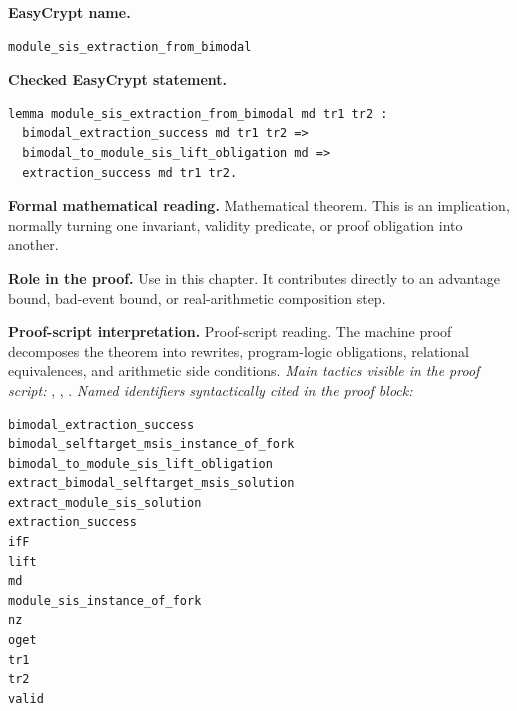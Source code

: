 \begin{formaltheorem}
\noindent\textbf{EasyCrypt name.}
\begin{lstlisting}[language=EasyCrypt,basicstyle=\ttfamily\scriptsize]
module_sis_extraction_from_bimodal
\end{lstlisting}
\noindent\textbf{Checked EasyCrypt statement.}
\begin{lstlisting}[language=EasyCrypt,basicstyle=\ttfamily\scriptsize]
lemma module_sis_extraction_from_bimodal md tr1 tr2 :
  bimodal_extraction_success md tr1 tr2 =>
  bimodal_to_module_sis_lift_obligation md =>
  extraction_success md tr1 tr2.
\end{lstlisting}
\noindent\textbf{Formal mathematical reading.}
Mathematical theorem. This is an implication, normally turning one invariant, validity predicate, or proof obligation into another.

\noindent\textbf{Role in the proof.}
Use in this chapter. It contributes directly to an advantage bound, bad-event bound, or real-arithmetic composition step.

\noindent\textbf{Proof-script interpretation.}
Proof-script reading. The machine proof decomposes the theorem into rewrites, program-logic obligations, relational equivalences, and arithmetic side conditions.
\emph{Main tactics visible in the proof script:} , , .
\emph{Named identifiers syntactically cited in the proof block:}
\begin{lstlisting}[language=EasyCrypt,basicstyle=\ttfamily\scriptsize]
bimodal_extraction_success
bimodal_selftarget_msis_instance_of_fork
bimodal_to_module_sis_lift_obligation
extract_bimodal_selftarget_msis_solution
extract_module_sis_solution
extraction_success
ifF
lift
md
module_sis_instance_of_fork
nz
oget
tr1
tr2
valid
\end{lstlisting}

\end{formaltheorem}

